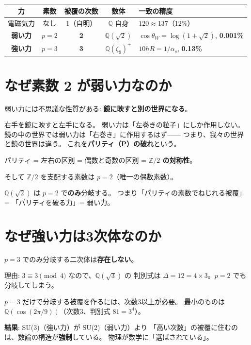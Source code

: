 \documentclass[12pt,a4paper]{article}
\begin{document}
\begin{resultbox}
\begin{center}
\renewcommand{\arraystretch}{1.5}
\begin{tabular}{ccccl}
\toprule
力 & 素数 & 被覆の次数 & 数体 & 一致の精度 \\
\midrule
電磁気力 & なし & 1（自明） & $\mathbb{Q}$ 自身 & $120 \approx 137$（12\%）\\
\textbf{弱い力} & \textbf{$p=2$} & \textbf{2} & $\mathbb{Q}(\sqrt{2})$ & $\cos\theta_W = \log(1+\sqrt{2})$, \textbf{0.001\%} \\
\textbf{強い力} & \textbf{$p=3$} & \textbf{3} & $\mathbb{Q}(\zeta_9)^+$ & $10 hR = 1/\alpha_s$, \textbf{0.13\%} \\
\bottomrule
\end{tabular}
\end{center}
\end{resultbox}

\section{なぜ素数 2 が弱い力なのか}

\begin{storybox}[パリティと 2]
弱い力には不思議な性質がある:
\textbf{鏡に映すと別の世界になる}。

右手を鏡に映すと左手になる。
弱い力は「左巻きの粒子」にしか作用しない。
鏡の中の世界では弱い力は「右巻き」に作用するはず——
つまり、我々の世界と鏡の世界は違う。
これを\textbf{パリティ（P）の破れ}という。

パリティ = 左右の区別 = 偶数と奇数の区別 = \textbf{$\mathbb{Z}/2$ の対称性}。

そして $\mathbb{Z}/2$ を支配する素数は \textbf{$p = 2$}（唯一の偶数素数）。

$\mathbb{Q}(\sqrt{2})$ は $p=2$ で\textbf{のみ}分岐する。
つまり「パリティの素数でねじれる被覆」= 「パリティを破る力」= 弱い力。
\end{storybox}

\section{なぜ強い力は3次体なのか}

\begin{mathbox}[数学が強制する階層]
$p = 3$ でのみ分岐する二次体は\textbf{存在しない}。

理由: $3 \equiv 3 \pmod{4}$ なので、$\mathbb{Q}(\sqrt{3})$ の
判別式は $\Delta = 12 = 4 \times 3$。$p=2$ でも分岐してしまう。

$p=3$ だけで分岐する被覆を作るには、次数3以上が必要。
最小のものは $\mathbb{Q}(\cos(2\pi/9))$（次数3、判別式 $81 = 3^4$）。

\textbf{結果}: SU(3)（強い力）が SU(2)（弱い力）より
「高い次数」の被覆に住むのは、数論の構造が\textbf{強制}している。
物理が数学に「選ばされている」。
\end{mathbox}
\end{document}
